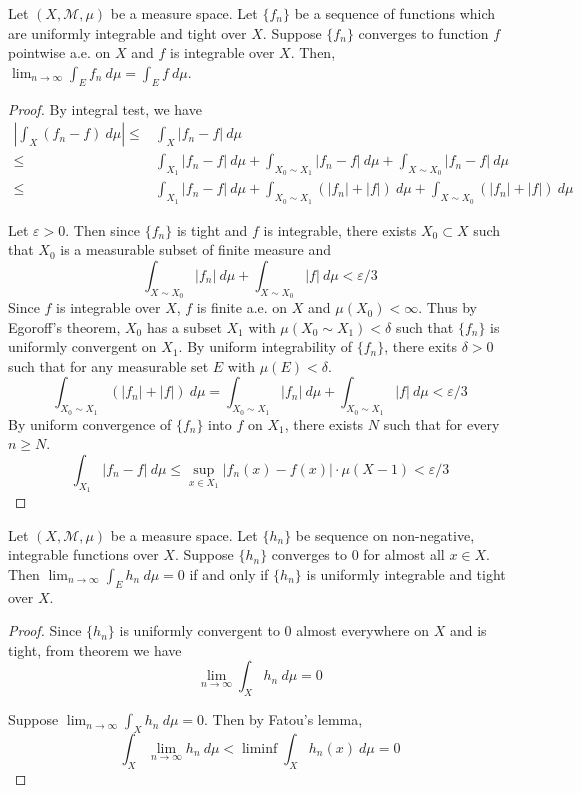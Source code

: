 \begin{theorem}
	Let $(X,\mathcal{M},\mu)$ be a measure space.
	Let $\{ f_n \}$ be a sequence of functions which are uniformly integrable and tight over $X$.
	Suppose $\{ f_n \}$ converges to function $f$ pointwise a.e. on $X$ and $f$ is integrable over $X$.
	Then,
	$\displaystyle \lim_{n \to \infty} \int_E f_n \ d\mu = \int_E f \ d\mu$.
\end{theorem}
\begin{proof}
	By integral test, we have
	\begin{align*}
		\left| \int_X (f_n - f) \ d\mu  \right| \le & \int_X |f_n - f| \ d\mu\\
		\le & \int_{X_1} |f_n-f|\ d\mu + \int_{X_0 \sim X_1} |f_n-f| \ d\mu + \int_{X \sim X_0} |f_n-f| \ d\mu \\
		\le & \int_{X_1} |f_n-f|\ d\mu + \int_{X_0 \sim X_1} (|f_n| + |f|) \ d\mu + \int_{X \sim X_0} (|f_n| + |f|) \ d\mu
	\end{align*}

	Let $\varepsilon > 0$.
	Then since $\{ f_n \}$ is tight and $f$ is integrable, there exists $X_0 \subset X$ such that $X_0$ is a measurable subset of finite measure and
	\begin{equation}
		\int_{X \sim X_0} |f_n| \ d\mu + \int_{X \sim X_0} |f|\ d\mu < \varepsilon/3
	\end{equation}
	Since $f$ is integrable over $X$, $f$ is finite a.e. on $X$ and $\mu(X_0) < \infty$.
	Thus by Egoroff's theorem, $X_0$ has a subset $X_1$ with $\mu(X_0 \sim X_1) < \delta$ such that $\{ f_n \}$ is uniformly convergent on $X_1$.
	By uniform integrability of $\{ f_n \}$, there exits $\delta > 0$ such that for any measurable set $E$ with $\mu(E) < \delta$.
	\begin{equation}
		\int_{X_0 \sim X_1} (|f_n|+ |f|) \ d\mu = \int_{X_0 \sim X_1} |f_n| \ d\mu + \int_{X_0 \sim X_1} |f|\ d\mu < \varepsilon/3
	\end{equation}
	By uniform convergence of $\{ f_n \}$ into $f$ on $X_1$, there exists $N$ such that for every $n \ge N$.
	\begin{equation}
		\int_{X_1} |f_n -f| \ d\mu \le \sup_{x \in X_1} |f_n(x) -f(x)| \cdot \mu(X-1) < \varepsilon/3
	\end{equation}
\end{proof}

\begin{corollary}
	Let $(X,\mathcal{M},\mu)$ be a measure space.
	Let $\{ h_n \}$  be sequence on non-negative, integrable functions over $X$.
	Suppose $\{ h_n \}$ converges to $0$ for almost all $x \in X$.
	Then $\displaystyle \lim_{n \to \infty} \int_E h_n \ d\mu = 0$ if and only if $\{ h_n \}$ is uniformly integrable and tight over $X$.
\end{corollary}
\begin{proof}
	Since $\{ h_n \}$ is uniformly convergent to $0$ almost everywhere on $X$ and is tight, from theorem we have 
	\[ \lim_{n \to \infty} \int_X h_n \ d\mu = 0 \]

	Suppose $\displaystyle \lim_{n \to \infty} \int_X h_n \ d\mu = 0$.
	Then by Fatou's lemma,
	\[ \int_X \lim_{n \to \infty} h_n \ d\mu < \liminf \int_X h_n(x) \ d\mu = 0 \]
\end{proof}

